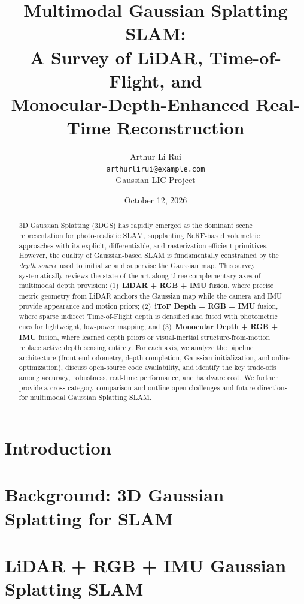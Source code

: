 \documentclass[10pt,a4paper]{article}
\title{Multimodal Gaussian Splatting SLAM: \\
       A Survey of LiDAR, Time-of-Flight, and \\
       Monocular-Depth-Enhanced Real-Time Reconstruction}
\author{Arthur Li Rui \\
  \texttt{arthurlirui@example.com} \\
  Gaussian-LIC Project
}
\date{October 12, 2026}
\begin{document}
\maketitle

\begin{abstract}
3D Gaussian Splatting (3DGS) has rapidly emerged as the dominant scene
representation for photo-realistic SLAM, supplanting NeRF-based volumetric
approaches with its explicit, differentiable, and rasterization-efficient
primitives.  However, the quality of Gaussian-based SLAM is fundamentally
constrained by the \emph{depth source} used to initialize and supervise the
Gaussian map.  This survey systematically reviews the state of the art along
three complementary axes of multimodal depth provision: (1)~\textbf{LiDAR +
RGB + IMU} fusion, where precise metric geometry from LiDAR anchors the
Gaussian map while the camera and IMU provide appearance and motion priors;
(2)~\textbf{iToF Depth + RGB + IMU} fusion, where sparse indirect
Time-of-Flight depth is densified and fused with photometric cues for
lightweight, low-power mapping; and (3)~\textbf{Monocular Depth + RGB + IMU}
fusion, where learned depth priors or visual-inertial structure-from-motion
replace active depth sensing entirely.  For each axis, we analyze the pipeline
architecture (front-end odometry, depth completion, Gaussian initialization,
and online optimization), discuss open-source code availability, and identify
the key trade-offs among accuracy, robustness, real-time performance, and
hardware cost.  We further provide a cross-category comparison and outline
open challenges and future directions for multimodal Gaussian Splatting SLAM.
\end{abstract}

\section{Introduction}
\label{sec:intro}


\section{Background: 3D Gaussian Splatting for SLAM}
\label{sec:background}


\section{LiDAR + RGB + IMU Gaussian Splatting SLAM}
\label{sec:lidar}

\end{document}

